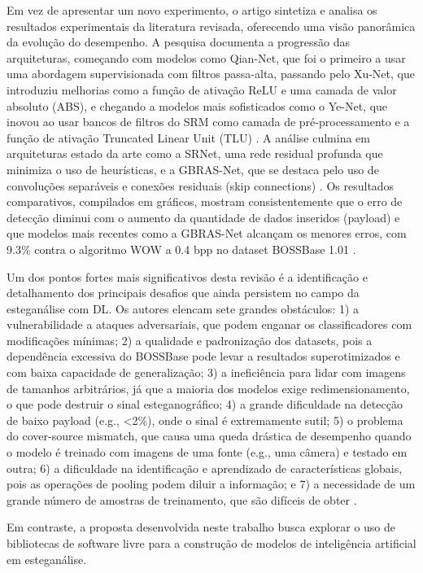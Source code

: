 \documentclass[12pt]{article}
\begin{document}
Em vez de apresentar um novo experimento, o artigo sintetiza e analisa os
resultados experimentais da literatura revisada, oferecendo uma visão
panorâmica da evolução do desempenho. A pesquisa documenta a progressão das
arquiteturas, começando com modelos como Qian-Net, que foi o primeiro a usar
uma abordagem supervisionada com filtros passa-alta, passando pelo Xu-Net, que
introduziu melhorias como a função de ativação ReLU e uma camada de valor
absoluto (ABS), e chegando a modelos mais sofisticados como o Ye-Net, que
inovou ao usar bancos de filtros do SRM como camada de pré-processamento e a
função de ativação Truncated Linear Unit (TLU) \cite{LaCroix2024survey}. A
análise culmina em arquiteturas estado da arte como a SRNet, uma rede residual
profunda que minimiza o uso de heurísticas, e a GBRAS-Net, que se destaca pelo
uso de convoluções separáveis e conexões residuais (skip connections)
\cite{LaCroix2024survey}. Os resultados comparativos, compilados em gráficos,
mostram consistentemente que o erro de detecção diminui com o aumento da
quantidade de dados inseridos (payload) e que modelos mais recentes como a
GBRAS-Net alcançam os menores erros, com 9.3\% contra o algoritmo WOW a 0.4 bpp
no dataset BOSSBase 1.01 \cite{LaCroix2024survey}.

Um dos pontos fortes mais significativos desta revisão é a identificação e
detalhamento dos principais desafios que ainda persistem no campo da
esteganálise com DL. Os autores elencam sete grandes obstáculos: 1) a
vulnerabilidade a ataques adversariais, que podem enganar os classificadores
com modificações mínimas; 2) a qualidade e padronização dos datasets, pois a
dependência excessiva do BOSSBase pode levar a resultados superotimizados e com
baixa capacidade de generalização; 3) a ineficiência para lidar com imagens de
tamanhos arbitrários, já que a maioria dos modelos exige redimensionamento, o
que pode destruir o sinal esteganográfico; 4) a grande dificuldade na detecção
de baixo payload (e.g., <2\%), onde o sinal é extremamente sutil; 5) o problema
do cover-source mismatch, que causa uma queda drástica de desempenho quando o
modelo é treinado com imagens de uma fonte (e.g., uma câmera) e testado em
outra; 6) a dificuldade na identificação e aprendizado de características
globais, pois as operações de pooling podem diluir a informação; e 7) a
necessidade de um grande número de amostras de treinamento, que são difíceis de
obter \cite{LaCroix2024survey}.

\newpage

Em contraste, a proposta desenvolvida neste trabalho busca explorar o uso de
bibliotecas de software livre para a construção de modelos de inteligência
artificial em esteganálise.
\end{document}
